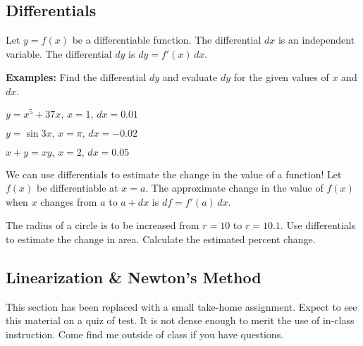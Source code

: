 \documentclass[addpoints, 12pt]{exam}
\begin{document}

\newpage
{}
\subsection*{Differentials}
\begin{tcolorbox}[title= DEFINITION OF A DIFFERENTIAL,colframe=black,sharp corners,colback=white,colbacktitle=white,coltitle=black,boxrule=1pt]

    Let $y=f(x)$ be a differentiable function. The differential $dx$ is an independent variable. The differential $dy$ is $dy=f'(x)\,dx$.
    
\end{tcolorbox}
\noindent\textbf{Examples:} Find the differential $dy$ and evaluate $dy$ for the given values of $x$ and $dx$.
\begin{questions}
    \question $y=x^5+37x,\,x=1,\,dx=0.01$
    
    \question $y=\sin3x,\,x=\pi,\,dx=-0.02$
    
    \question $x+y=xy,\,x=2,\,dx=0.05$
\end{questions}

We can use differentials to estimate the change in the value of a function! Let $f(x)$ be differentiable at $x=a$. The approximate change in the value of $f(x)$ when $x$ changes from $a$ to $a+dx$ is $df=f'(a)\,dx$.
\begin{questions}
    \setcounter{question}{3}
    \question The radius of a circle is to be increased from $r=10$ to $r=10.1$. Use differentials to estimate the change in area. Calculate the estimated percent change.
\end{questions}

\subsection*{Linearization \& Newton's Method}
This section has been replaced with a small take-home assignment. Expect to see this material on a quiz of test. It is not dense enough to merit the use of in-class instruction. Come find me outside of class if you have questions.
\end{document}
